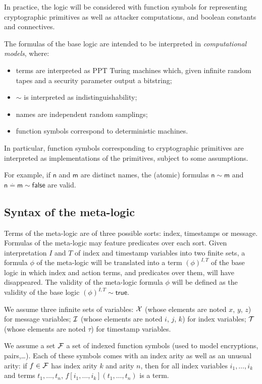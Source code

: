 \documentclass[a4paper]{article}
\theoremstyle{remark}
\begin{document}
In practice, the logic will be considered with function symbols for 
representing cryptographic primitives as well as attacker computations, and 
boolean constants and connectives.

The formulas of the base logic are intended to be interpreted in 
\emph{computational models}, where:
\begin{itemize}
  \item terms are interpreted as PPT Turing machines which,
    given infinite random tapes and a security parameter output a bitstring;
  \item $\sim$ is interpreted as indistinguishability;
  \item names are independent random samplings;
  \item function symbols correspond to deterministic machines.
\end{itemize}

In particular, function symbols corresponding to cryptographic primitives
are interpreted as implementations of the primitives, subject to some
assumptions.

For example, if $\mathsf{n}$ and $\mathsf{m}$ are distinct names,
the (atomic) formulas $\mathsf{n}\sim\mathsf{m}$ and 
$\mathsf{n}\stackrel{.}{=}\mathsf{m}\sim\mathsf{false}$
are valid.

\subsection{Syntax of the meta-logic}

Terms of the meta-logic are of three possible sorts: index, timestamps
or message. Formulas of the meta-logic may feature predicates over each sort.
Given interpretation $I$ and $T$ of index and timestamp variables
into two finite sets, a formula $\phi$ of the meta-logic will be translated 
into a term $(\phi)^{I,T}$ of the base logic in which index and action terms, 
and predicates over them, will have disappeared. The validity of the 
meta-logic formula $\phi$ will be defined as the validity of the base logic
$(\phi)^{I,T}\sim\mathsf{true}$.

\medskip

We assume three infinite sets of variables:
$\mathcal{X}$ (whose elements are noted $x$, $y$, $z$) for message variables;
$\mathcal{I}$ (whose elements are noted $i$, $j$, $k$) for index variables;
$\mathcal{T}$ (whose elements are noted $\tau$) for timestamp variables.

We assume a set $\mathcal{F}$ a set of indexed function symbols
(used to model encryptions, pairs,\dots).
Each of these symbols comes with an index arity as well as an unusual arity:
if $f\in\mathcal{F}$ has index arity $k$ and arity $n$,
then for all index variables $i_1,\ldots,i_k$ and terms $t_1,\ldots,t_n$,
$f[i_1,\ldots,i_k](t_1,\ldots,t_n)$ is a term.
\end{document}

